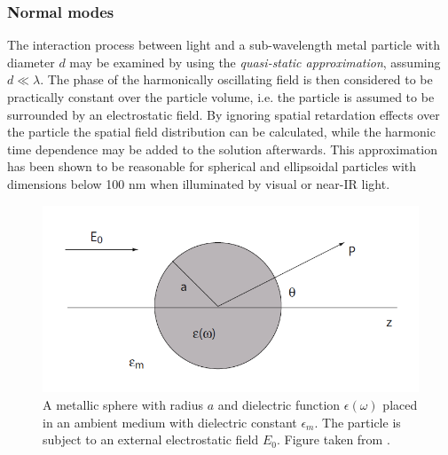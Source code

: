 \subsubsection{Normal modes}
The interaction process between light and a sub-wavelength metal particle with diameter $d$ may be examined by using the \emph{quasi-static approximation}, assuming $d\ll \lambda$. The  phase  of  the  harmonically  oscillating  field is then considered to be practically constant over the particle volume, i.e. the particle is assumed to be surrounded by an electrostatic field. By ignoring spatial retardation effects over the particle the spatial field distribution can be calculated, while the harmonic time dependence may be added to the solution afterwards. This approximation has been shown to be reasonable for spherical and ellipsoidal particles with dimensions below 100 nm when illuminated by visual or near-IR light\cite{maier}.

\begin{figure}
    \centering
    \includegraphics[scale=0.6]{figures/Ch2/SphereNormalMode.PNG}
    \caption{A metallic sphere with radius $a$ and dielectric function $\epsilon(\omega)$ placed in an ambient medium with dielectric constant $\epsilon_m$. The particle is subject to an external electrostatic field $E_0$. Figure taken from \cite{maier}.} 
    \label{fig:normalmode}
\end{figure}

